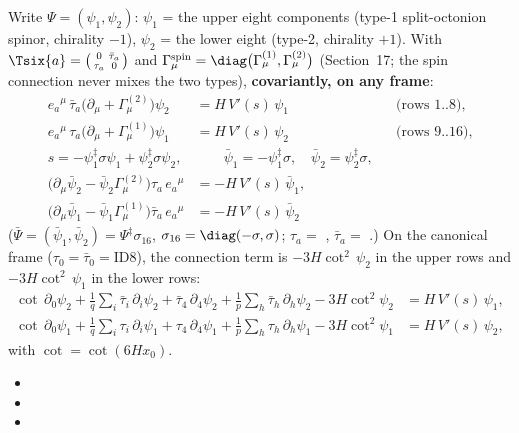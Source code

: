 Write $\Psi=(\psi_1,\psi_2)$: $\psi_1$ = the upper eight components (type-1 split-octonion spinor,
chirality $-1$), $\psi_2$ = the lower eight (type-2, chirality $+1$). With
$\Tsix{a}=\bigl(\begin{smallmatrix}0&\bar\tau_a\\ \tau_a&0\end{smallmatrix}\bigr)$ and
$\Gamma^{\mathrm{spin}}_\mu=\diag\bigl(\Gamma^{(1)}_\mu,\Gamma^{(2)}_\mu\bigr)$ (Section~17; the spin
connection never mixes the two types), \textbf{covariantly, on any frame}:
\begin{align*}
  e_a{}^\mu\,\bar\tau_a\bigl(\partial_\mu+\Gamma^{(2)}_\mu\bigr)\psi_2&=H\,V'(s)\,\psi_1 &&\text{(rows 1..8)},\\
  e_a{}^\mu\,\tau_a\bigl(\partial_\mu+\Gamma^{(1)}_\mu\bigr)\psi_1&=H\,V'(s)\,\psi_2 &&\text{(rows 9..16)},\\
  s=-\psi_1^{\ddagger}\sigma\psi_1+\psi_2^{\ddagger}\sigma\psi_2,&\qquad \bar\psi_1=-\psi_1^{\ddagger}\sigma,\quad \bar\psi_2=\psi_2^{\ddagger}\sigma,\\
  \bigl(\partial_\mu\bar\psi_2-\bar\psi_2\Gamma^{(2)}_\mu\bigr)\tau_a\,e_a{}^\mu&=-H\,V'(s)\,\bar\psi_1,\\
  \bigl(\partial_\mu\bar\psi_1-\bar\psi_1\Gamma^{(1)}_\mu\bigr)\bar\tau_a\,e_a{}^\mu&=-H\,V'(s)\,\bar\psi_2
\end{align*}
($\bar\Psi=(\bar\psi_1,\bar\psi_2)=\Psi^{\ddagger}\sigma_{16}$, $\sigma_{16}=\diag(-\sigma,\sigma)$;
$\tau_a=$ , $\bar\tau_a=$ .) On the canonical frame
($\tau_0=\bar\tau_0=\mathrm{ID8}$), the connection term is $-3H\cot^2\,\psi_2$ in the upper rows and
$-3H\cot^2\,\psi_1$ in the lower rows:
\begin{align*}
  \cot\,\partial_0\psi_2+\frac1q\sum_i\bar\tau_i\,\partial_i\psi_2+\bar\tau_4\,\partial_4\psi_2+\frac1p\sum_h\bar\tau_h\,\partial_h\psi_2-3H\cot^2\psi_2&=H\,V'(s)\,\psi_1,\\
  \cot\,\partial_0\psi_1+\frac1q\sum_i\tau_i\,\partial_i\psi_1+\tau_4\,\partial_4\psi_1+\frac1p\sum_h\tau_h\,\partial_h\psi_1-3H\cot^2\psi_1&=H\,V'(s)\,\psi_2 ,
\end{align*}
with $\cot=\cot(6Hx_0)$. 
\begin{itemize}
  \item {}
  \item {}
  \item {}
\end{itemize}

